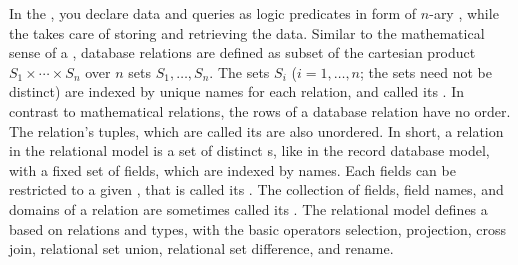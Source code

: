 In the , you declare data and queries as 
logic predicates in form of  $n$-ary , while 
the  takes care of storing and retrieving the data. Similar to the
mathematical sense of a , database relations are defined as 
subset of the cartesian product $S_1 \times \cdots \times S_n$ over $n$ sets
$S_1, \ldots, S_n$. The sets $S_i$ ($i=1,\ldots,n$; the sets need not be distinct)
are indexed by unique names for each relation, and called its 
. In contrast to mathematical relations, the
rows of a database relation have no order. The relation's tuples, which are 
called its  are also unordered. In short, a
relation in the relational model is a set of distinct s, like in
the record database model, with a fixed set of fields, which are indexed by 
names. Each fields can be restricted to a given , that is 
called its . The collection of fields, field names, and domains
of a relation are sometimes called its . 
The relational model defines a  based on relations
and types, with the basic operators selection, projection, cross join, 
relational set union, relational set difference, and rename. 


